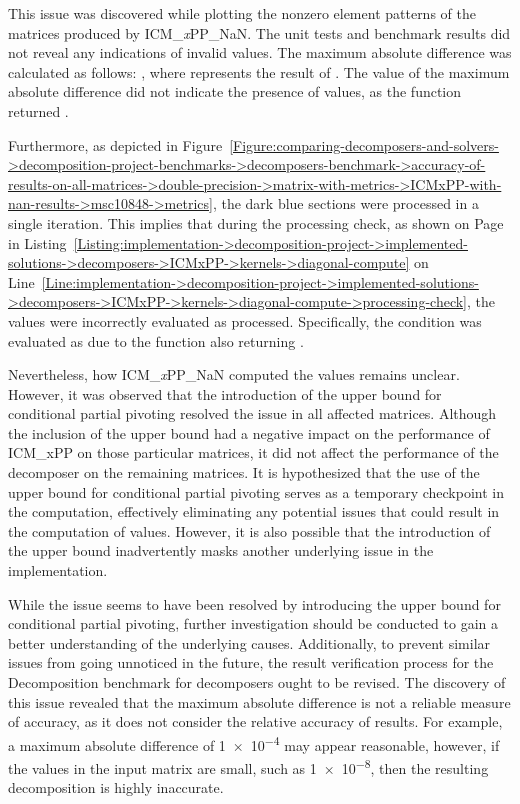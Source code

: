 This issue was discovered while plotting the nonzero element patterns of the  matrices produced by ICM\_\textit{x}PP\_NaN.
The unit tests and benchmark results did not reveal any indications of invalid values.
The maximum absolute difference was calculated as follows: , where  represents the result of .
The value of the maximum absolute difference did not indicate the presence of  values, as the  function returned .

Furthermore, as depicted in Figure~\ref{Figure:comparing-decomposers-and-solvers->decomposition-project-benchmarks->decomposers-benchmark->accuracy-of-results-on-all-matrices->double-precision->matrix-with-metrics->ICMxPP-with-nan-results->msc10848->metrics}, the dark blue sections were processed in a single iteration.
This implies that during the processing check, as shown on
Page~\pageref{Listing:implementation->decomposition-project->implemented-solutions->decomposers->ICMxPP->kernels->diagonal-compute} in Listing~\ref{Listing:implementation->decomposition-project->implemented-solutions->decomposers->ICMxPP->kernels->diagonal-compute} on Line~\ref{Line:implementation->decomposition-project->implemented-solutions->decomposers->ICMxPP->kernels->diagonal-compute->processing-check}, the  values were incorrectly evaluated as processed.
Specifically, the condition  was evaluated as  due to the  function also returning .

Nevertheless, how ICM\_\textit{x}PP\_NaN computed the  values remains unclear.
However, it was observed that the introduction of the upper bound for conditional partial pivoting resolved the issue in all affected matrices.
Although the inclusion of the upper bound had a negative impact on the performance of ICM\_xPP on those particular matrices, it did not affect the performance of the decomposer on the remaining matrices.
It is hypothesized that the use of the upper bound for conditional partial pivoting serves as a temporary checkpoint in the computation, effectively eliminating any potential issues that could result in the computation of  values.
However, it is also possible that the introduction of the upper bound inadvertently masks another underlying issue in the implementation.

While the issue seems to have been resolved by introducing the upper bound for conditional partial pivoting, further investigation should be conducted to gain a better understanding of the underlying causes.
Additionally, to prevent similar issues from going unnoticed in the future, the result verification process for the Decomposition benchmark for decomposers ought to be revised.
The discovery of this issue revealed that the maximum absolute difference is not a reliable measure of accuracy, as it does not consider the relative accuracy of results.
For example, a maximum absolute difference of \num{1e-4} may appear reasonable, however, if the values in the input matrix are small, such as \num{1e-8}, then the resulting decomposition is highly inaccurate.

